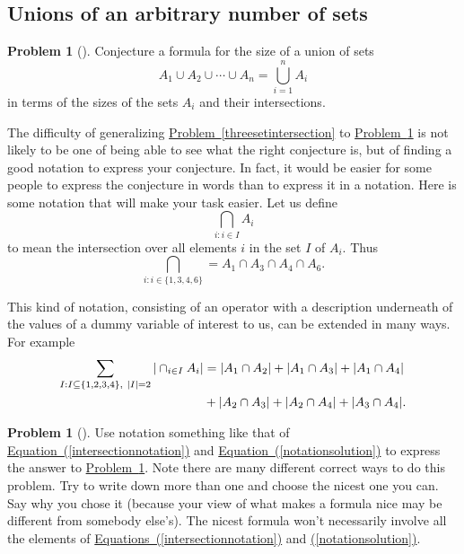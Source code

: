 \documentclass[10pt,]{book}
\theoremstyle{plain}
\theoremstyle{definition}
\newtheorem{activity}[project]{Problem}
\theoremstyle{definition}
\numberwithin{equation}{chapter}
\newcommand{\amp}{&}
\begin{document}
\subsection[{Unions of an arbitrary number of sets}]{Unions of an arbitrary number of sets}\label{subsection-52}
\begin{activity}[] \label{nsetintersection}
\hypertarget{p-1329}{}%
Conjecture a formula for the size of a union of sets%
\begin{equation*}
A_1\cup
A_2\cup \cdots\cup A_n = \bigcup_{i=1}^n A_i
\end{equation*}
in terms of the sizes of the sets \(A_i\) and their intersections.%
\end{activity}
\hypertarget{p-1331}{}%
The difficulty of generalizing \hyperref[threesetintersection]{Problem~\ref{threesetintersection}} to \hyperref[nsetintersection]{Problem~\ref{nsetintersection}} is not likely to be one of being able to see what the right conjecture is, but of finding a good notation to express your conjecture. In fact, it would be easier for some people to express the conjecture in words than to express it in a notation. Here is some notation that will make your task easier. Let us define%
\begin{equation*}
\bigcap_{i:i\in I}A_i
\end{equation*}
to mean the intersection over all elements \(i\) in the set \(I\) of \(A_i\). Thus%
\begin{equation}
\bigcap_{i:i\in
\{1,3,4,6\}} = A_1\cap A_3\cap A_4 \cap A_6.\label{intersectionnotation}
\end{equation}
%
\par
\hypertarget{p-1332}{}%
This kind of notation, consisting of an operator with a description underneath of the values of a dummy variable of interest to us, can be extended in many ways. For example%
\begin{align}
\sum_{I:I \subseteq \{1,2,3,4\}, \ |I|=2} |\cap_{i\in I}
A_i|  \amp =  |A_1\cap A_2|+ |A_1\cap A_3|
+|A_1\cap A_4|\notag\\
\amp +  |A_2\cap A_3|+
|A_2\cap A_4| +|A_3\cap A_4|.\label{notationsolution}
\end{align}
%
\begin{activity}[] \label{inclusion-exclusionunion}
\hypertarget{p-1333}{}%
Use notation something like that of \hyperref[intersectionnotation]{Equation~(\ref{intersectionnotation})} and \hyperref[notationsolution]{Equation~(\ref{notationsolution})} to express the answer to \hyperref[nsetintersection]{Problem~\ref{nsetintersection}}. Note there are many different correct ways to do this problem. Try to write down more than one and choose the nicest one you can. Say why you chose it (because your view of what makes a formula nice may be different from somebody else's). The nicest formula won't necessarily involve all the elements of \hyperref[intersectionnotation]{Equations~(\ref{intersectionnotation})} and \hyperref[notationsolution]{(\ref{notationsolution})}.%
\end{activity}
\end{document}
